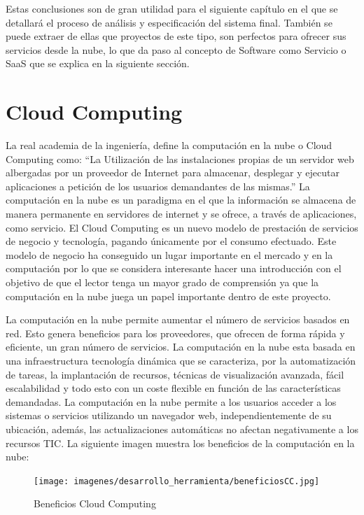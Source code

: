 \documentclass[a4paper,11pt]{book}
\begin{document}
Estas conclusiones son de gran utilidad para el siguiente capítulo en el que se detallará el proceso de análisis y especificación del sistema final. También se puede extraer de ellas que proyectos de este tipo, son perfectos para ofrecer sus servicios desde la nube, lo que da paso al concepto de Software como Servicio o SaaS que se explica en la siguiente sección. 


\section{Cloud Computing}

La real academia de la ingeniería, define la computación en la nube o Cloud Computing  como: “La Utilización de las instalaciones propias de un servidor web albergadas por un proveedor de Internet para almacenar, desplegar y ejecutar aplicaciones a petición de los usuarios demandantes de las mismas.”\cite{RAI} La computación en la nube es un paradigma en el que la información se almacena de manera permanente en servidores de internet y se ofrece, a través de aplicaciones, como servicio. El Cloud Computing es un nuevo modelo de prestación de servicios\cite{magazine} de negocio y tecnología, pagando únicamente por el consumo efectuado. Este modelo de negocio ha conseguido un lugar importante en el mercado y en la computación  por lo que se considera  interesante hacer una introducción con el objetivo de que el lector tenga un mayor grado de comprensión ya que la computación en la nube juega un papel importante dentro de este proyecto.  

La computación en la nube permite aumentar el número de servicios basados en red. Esto genera beneficios para los proveedores, que ofrecen de forma rápida y eficiente, un gran número de servicios. La computación en la nube esta basada en una infraestructura tecnología dinámica que se caracteriza, por la automatización de tareas, la implantación de recursos, técnicas de visualización avanzada, fácil escalabilidad y todo esto con un coste flexible en función de las características demandadas.  La computación en la nube permite a los usuarios acceder a los sistemas o servicios utilizando un navegador web, independientemente de su ubicación, además,  las actualizaciones automáticas no afectan negativamente a los recursos TIC. La siguiente imagen muestra los beneficios de la computación en la nube:

\begin{figure}[H] 
\centering 
\texttt{[image: imagenes/desarrollo\_herramienta/beneficiosCC.jpg]}
\caption{ Beneficios Cloud Computing\cite{beneficios} }
\end{figure}
\end{document}
